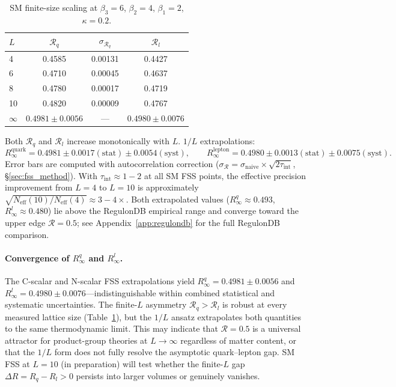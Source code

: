 \documentclass[12pt,a4paper]{article}
\newcommand{\R}{\mathcal{R}}           %
\theoremstyle{plain}
\theoremstyle{definition}
\theoremstyle{remark}
\begin{document}
\begin{table}[ht]
\centering
\caption{SM finite-size scaling at $\beta_3=6$, $\beta_2=4$, $\beta_1=2$, $\kappa=0.2$.}
\label{tab:sm_fss}
\begin{tabular}{lccc}
\toprule
$L$ & $\R_q$ & $\sigma_{\R_q}$ & $\R_l$ \\
\midrule
4 & 0.4585 & 0.00131 & 0.4427 \\
6 & 0.4710 & 0.00045 & 0.4637 \\
8 & 0.4780 & 0.00017 & 0.4719 \\
10 & 0.4820 & 0.00009 & 0.4767 \\
\midrule
$\infty$ & $\mathbf{0.4981\pm0.0056}$ & --- & $\mathbf{0.4980\pm0.0076}$ \\
\bottomrule
\end{tabular}
\end{table}

Both $\R_q$ and $\R_l$ increase monotonically with $L$.
$1/L$ extrapolations:
\[
  R_\infty^{\text{quark}} = 0.4981 \pm 0.0017(\text{stat}) \pm 0.0054(\text{syst}), \qquad
  R_\infty^{\text{lepton}} = 0.4980 \pm 0.0013(\text{stat}) \pm 0.0075(\text{syst}).
\]
Error bars are computed with autocorrelation correction ($\sigma_\R = \sigma_\text{naive}\times\sqrt{2\tau_\text{int}}$, §\ref{sec:fss_method}).
With $\tau_\text{int}\approx 1{-}2$ at all SM FSS points, the effective precision improvement from $L=4$ to $L=10$ is approximately $\sqrt{N_\text{eff}(10)/N_\text{eff}(4)}\approx 3{-}4\times$.
Both extrapolated values ($R_\infty^q\approx0.493$, $R_\infty^l\approx0.480$) lie above the RegulonDB empirical
range and converge toward the upper edge $\R=0.5$;
see Appendix~\ref{app:regulondb} for the full RegulonDB comparison.

\paragraph{Convergence of $R_\infty^q$ and $R_\infty^l$.}
The C-scalar and N-scalar FSS extrapolations yield
$R_\infty^q = 0.4981\pm0.0056$ and $R_\infty^l = 0.4980\pm0.0076$---indistinguishable
within combined statistical and systematic uncertainties.
The finite-$L$ asymmetry $\R_q>\R_l$ is robust at every measured lattice size
(Table~\ref{tab:sm_fss}), but the $1/L$ ansatz extrapolates both quantities to the
same thermodynamic limit.
This may indicate that $\R=0.5$ is a universal attractor for product-group theories
at $L\to\infty$ regardless of matter content, or that the $1/L$ form does not fully
resolve the asymptotic quark--lepton gap.
SM FSS at $L=10$ (in preparation) will test whether the finite-$L$ gap
$\Delta R = R_q - R_l > 0$ persists into larger volumes or genuinely vanishes.
\end{document}
